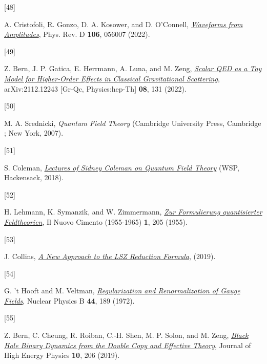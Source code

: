 \documentclass[
  11pt,
  a4paper,
  DIV=11,
  numbers=noendperiod,
  twoside]{scrreprt}
\newlength{\cslhangindent}
\newlength{\csllabelwidth}
\newlength{\cslentryspacingunit} %
\newenvironment{CSLReferences}[2] %
 {%
  \setlength{\parindent}{0pt}
  \ifodd #1
  \let\oldpar\par
  \def\par{\hangindent=\cslhangindent\oldpar}
  \fi
  \setlength{\parskip}{#2\cslentryspacingunit}
 }%
 {}
\newcommand{\CSLLeftMargin}[1]{\parbox[t]{\csllabelwidth}{#1}}
\newcommand{\CSLRightInline}[1]{\parbox[t]{\linewidth - \csllabelwidth}{#1}\break}
\DeclareRobustCommand{\[}{\begin{equation}}
\DeclareRobustCommand{\]}{\end{equation}}
\begin{document}
\begin{CSLReferences}{0}{0}
\leavevmode{}%
\CSLLeftMargin{{[}48{]} }%
\CSLRightInline{A. Cristofoli, R. Gonzo, D. A. Kosower, and D.
O'Connell,
\emph{\href{https://doi.org/10.1103/PhysRevD.106.056007}{Waveforms from
Amplitudes}}, Phys. Rev. D \textbf{106}, 056007 (2022).}

\leavevmode{}%
\CSLLeftMargin{{[}49{]} }%
\CSLRightInline{Z. Bern, J. P. Gatica, E. Herrmann, A. Luna, and M.
Zeng, \emph{\href{https://doi.org/10.1007/JHEP08(2022)131}{Scalar {QED}
as a Toy Model for Higher-Order Effects in Classical Gravitational
Scattering}}, arXiv:2112.12243 {[}Gr-Qc, Physics:hep-Th{]} \textbf{08},
131 (2022).}

\leavevmode{}%
\CSLLeftMargin{{[}50{]} }%
\CSLRightInline{M. A. Srednicki, \emph{Quantum Field Theory} ({Cambridge
University Press}, {Cambridge ; New York}, 2007).}

\leavevmode{}%
\CSLLeftMargin{{[}51{]} }%
\CSLRightInline{S. Coleman,
\emph{\href{https://doi.org/10.1142/9371}{Lectures of {Sidney Coleman}
on {Quantum Field Theory}}} ({WSP}, {Hackensack}, 2018).}

\leavevmode{}%
\CSLLeftMargin{{[}52{]} }%
\CSLRightInline{H. Lehmann, K. Symanzik, and W. Zimmermann,
\emph{\href{https://doi.org/10.1007/BF02731765}{{Zur Formulierung
quantisierter Feldtheorien}}}, Il Nuovo Cimento (1955-1965) \textbf{1},
205 (1955).}

\leavevmode{}%
\CSLLeftMargin{{[}53{]} }%
\CSLRightInline{J. Collins,
\emph{\href{https://arxiv.org/abs/1904.10923}{A New Approach to the
{LSZ} Reduction Formula}}, (2019).}

\leavevmode{}%
\CSLLeftMargin{{[}54{]} }%
\CSLRightInline{G. 't Hooft and M. Veltman,
\emph{\href{https://doi.org/10.1016/0550-3213(72)90279-9}{Regularization
and Renormalization of Gauge Fields}}, Nuclear Physics B \textbf{44},
189 (1972).}

\leavevmode{}%
\CSLLeftMargin{{[}55{]} }%
\CSLRightInline{Z. Bern, C. Cheung, R. Roiban, C.-H. Shen, M. P. Solon,
and M. Zeng, \emph{\href{https://doi.org/10.1007/JHEP10(2019)206}{Black
Hole Binary Dynamics from the Double Copy and Effective Theory}},
Journal of High Energy Physics \textbf{10}, 206 (2019).}


\end{CSLReferences}
\end{document}
